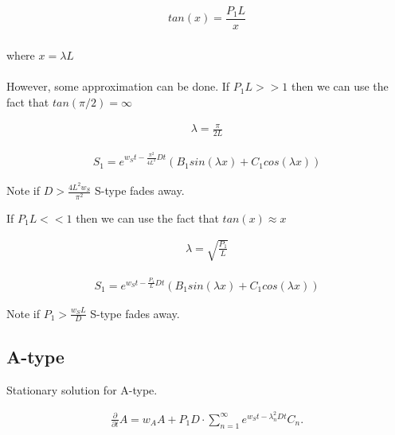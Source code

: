 \documentclass[10pt, oneside]{article}
\begin{document}
\begin{linenomath}
	\begin{align} 
	\label{eq:a-lambda1}
	 tan(x)=\dfrac{P_1L}{x}\\
	\end{align}
	\end{linenomath}

where $x=\lambda L$\\
\\
However, some approximation can be done.  If $P_1L>>1$ then we can use the fact that $tan(\pi/2)=\infty$

\begin{linenomath}
	\begin{align} 
	\lambda = \frac{\pi}{2L} 
	\end{align}
\end{linenomath}	

\begin{linenomath}
	\begin{align} 
	S_1=e^{w_St-\frac{\pi^2}{4L^2}Dt}\left(B_1sin(\lambda x)+C_1cos(\lambda x )\right)
	\end{align}
\end{linenomath}
Note if $D>\frac{4L^2w_S}{\pi^2}$ S-type fades away.
	
 If $P_1L<<1$ then we can use the fact that $tan(x)\approx x$
\begin{linenomath}
	\begin{align} 
	\lambda = \sqrt{\frac{P_1}{L}}
\end{align}
\end{linenomath}

\begin{linenomath}
	\begin{align} 
	S_1=e^{w_St-\frac{P_1}{L}Dt}\left(B_1sin(\lambda x)+C_1cos(\lambda x )\right)
	\end{align}
\end{linenomath}


Note if $P_1>\frac{w_SL}{D}$ S-type fades away.



\subsection{A-type}
Stationary solution for A-type.

\begin{linenomath}
	\begin{align} 
	\frac{\partial}{\partial t} A = w_A A + P_1D \cdot\sum_{n=1}^{\infty} e^{w_St-\lambda_n^2Dt}C_n .
	\end{align}
\end{linenomath}
\end{document}
